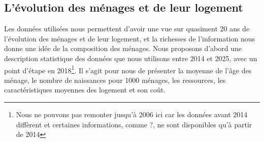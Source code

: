 \documentclass[12pt,a4paper]{article}
\begin{document}
\subsection{L'évolution des ménages et de leur logement}

Les données utilisées nous permettent d'avoir une vue sur quasiment 20 ans de l'évolution des ménages et de leur logement, et la richesses de l'information nous donne une idée de la composition des ménages. Nous proposons d'abord une description statistique des données que nous utilisons entre 2014 et 2025, avec un point d'étape en 2018\footnote{Nous ne pouvons pas remonter jusqu'à 2006 ici car les données avant 2014 diffèrent et certaines informations, comme ?, ne sont disponibles qu'à partir de 2014}. Il s'agit pour nous de présenter la moyenne de l'âge des ménage, le nombre de naissances pour 1000 ménages, les ressources, les caractéristiques moyennes des logement et son coût.  
\end{document}
